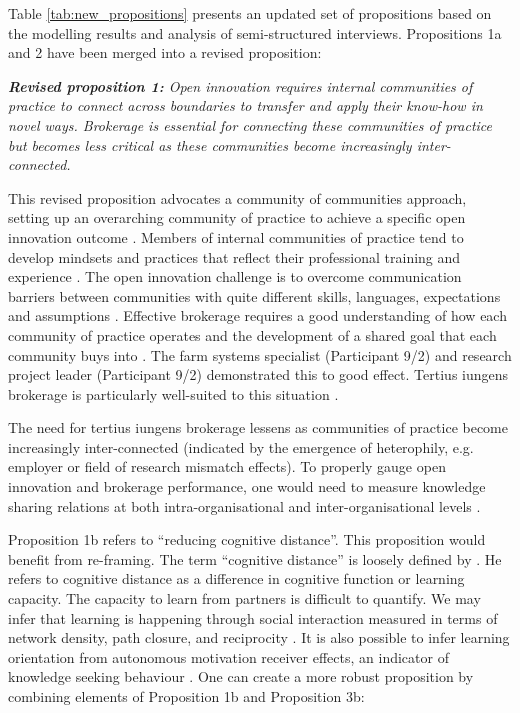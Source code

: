 Table \ref{tab:new_propositions} presents an updated set of propositions based on the modelling results and analysis of semi-structured interviews. Propositions 1a and 2 have been merged into a revised proposition: \bigskip

\begin{tcolorbox}
\textit{\textbf{Revised proposition 1:} Open innovation requires internal communities of practice to connect across boundaries to transfer and apply their know-how in novel ways. Brokerage is essential for connecting these communities of practice but becomes less critical as these communities become increasingly inter-connected.} 
\end{tcolorbox}

This revised proposition advocates a community of communities approach, setting up an overarching community of practice to achieve a specific open innovation outcome \citep{palla2005uncovering, west2008getting, sytch2014exploring, dumbach2014establishing}. Members of internal communities of practice tend to develop mindsets and practices that reflect their professional training and experience \citep{garrety2004integrating,wenger2011communities}. The open innovation challenge is to overcome communication barriers between communities with quite different skills, languages, expectations and assumptions \citep{fleming2007brokerage,chesbrough2012open}. Effective brokerage requires a good understanding of how each community of practice operates and the development of a shared goal that each community buys into \citep{garrety2004integrating,adler2008perspective,hargadon2014brokerage,kwon2020network}. The farm systems specialist (Participant 9/2) and research project leader (Participant 9/2) demonstrated this to good effect. Tertius iungens brokerage is particularly well-suited to this situation \citep{obstfeld2014brokerage, quintane2016brokers, grosser2019measuring}. \medskip

The need for tertius iungens brokerage lessens as communities of practice become increasingly inter-connected (indicated by the emergence of heterophily, e.g. employer or field of research mismatch effects). To properly gauge open innovation and brokerage performance, one would need to measure knowledge sharing relations at both intra-organisational and inter-organisational levels \citep{jasny2015two}. \medskip

Proposition 1b refers to \enquote{reducing cognitive distance}. This proposition would benefit from re-framing. The term \enquote{cognitive distance} is loosely defined by \citet{nooteboom2000learning}. He refers to cognitive distance as a difference in cognitive function or learning capacity. The capacity to learn from partners is difficult to quantify. We may infer that learning is happening through social interaction measured in terms of network density, path closure, and reciprocity \citep{reagans2003network, marsden2012reflections, phelps2012knowledge}. It is also possible to infer learning orientation from autonomous motivation receiver effects, an indicator of knowledge seeking behaviour \citep{gagne2009model,gubbins2021delineating}. One can create a more robust proposition by combining elements of Proposition 1b and Proposition 3b: \bigskip

